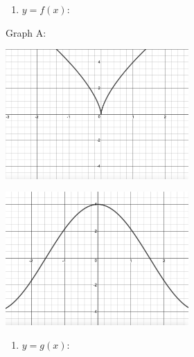 \begin{center}


\begin{multicols}{2}

\begin{enumerate}
\setcounter{enumi}{\value{HW}}

\item \label{MatchFcnDerivative2first} $y = f(x)$:

\setcounter{HW}{\value{enumi}}
\end{enumerate}

Graph A:

\end{multicols}




\begin{multicols}{2}

\includegraphics[width=2.75in]{./IntroductiontoDerivativesGraphics/MatchFunc04.jpeg}

\includegraphics[width=2.75in]{./IntroductiontoDerivativesGraphics/MatchDeriv06.jpeg}

\end{multicols}



\begin{multicols}{2}

\begin{enumerate}
\setcounter{enumi}{\value{HW}}

\item $y = g(x)$:


\end{enumerate}
\end{multicols}
\end{center}

